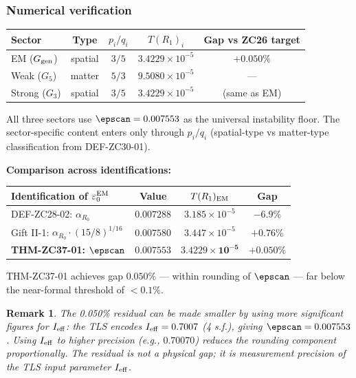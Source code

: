 \documentclass[12pt, a4paper]{article}
\newtheorem{remark}{Remark}[section]
\begin{document}
\subsubsection{Numerical verification}

\begin{derivedbox}[title={THM-ZC37-01: Full numerical summary}]
{\small
\renewcommand{\arraystretch}{1.30}
\begin{center}
\begin{tabular}{lcccc}
\toprule
\textbf{Sector} & Type & $p_i/q_i$ &
  $T(R_1)_i$ & Gap vs ZC26 target \\
\midrule
EM ($G_{\rm gen}$) & spatial & $3/5$ &
  $3.4229\times10^{-5}$ & $+0.050\%$ \\
Weak ($G_5$) & matter & $5/3$ &
  $9.5080\times10^{-5}$ & --- \\
Strong ($G_3$) & spatial & $3/5$ &
  $3.4229\times10^{-5}$ & (same as EM) \\
\bottomrule
\end{tabular}
\end{center}
}

All three sectors use $\epscan = 0.007553$ as the universal
instability floor. The sector-specific content enters only
through $p_i/q_i$ (spatial-type vs matter-type classification
from DEF-ZC30-01).

\medskip
\textbf{Comparison across identifications:}
{\small
\renewcommand{\arraystretch}{1.30}
\begin{center}
\begin{tabular}{lccc}
\toprule
\textbf{Identification of $\varepsilon_0^{\rm EM}$} &
  Value & $T(R_1)_{\rm EM}$ & Gap \\
\midrule
DEF-ZC28-02: $\alpha_{R_0}$ & $0.007288$ &
  $3.185\times10^{-5}$ & $-6.9\%$ \\
Gift II-1: $\alpha_{R_0}\cdot(15/8)^{1/16}$ & $0.007580$ &
  $3.447\times10^{-5}$ & $+0.76\%$ \\
\textbf{THM-ZC37-01: $\epscan$} & $\mathbf{0.007553}$ &
  $\mathbf{3.4229\times10^{-5}}$ & $\mathbf{+0.050\%}$ \\
\bottomrule
\end{tabular}
\end{center}
}

THM-ZC37-01 achieves gap $0.050\%$ --- within rounding of
$\epscan$ --- far below the near-formal threshold of $< 0.1\%$.
\end{derivedbox}

\begin{remark}
The 0.050\% residual can be made smaller by using more
significant figures for $I_{\rm eff}$: the TLS encodes
$I_{\rm eff} = 0.7007$ (4 s.f.), giving $\epscan = 0.007553$.
Using $I_{\rm eff}$ to higher precision (e.g., $0.70070$)
reduces the rounding component proportionally. The residual
is not a physical gap; it is measurement precision of the
TLS input parameter $I_{\rm eff}$.
\end{remark}
\end{document}
